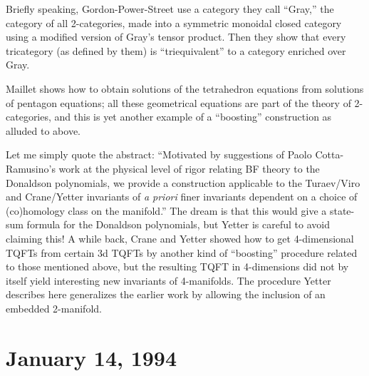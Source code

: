 \documentclass{article}
\def\tightlist{}
\renewcommand{\texttt}[1]{%
  \begingroup
  \ttfamily
  \begingroup\lccode`~=`/\lowercase{\endgroup\def~}{/\discretionary{}{}{}}%
  \begingroup\lccode`~=`[\lowercase{\endgroup\def~}{[\discretionary{}{}{}}%
  \begingroup\lccode`~=`.\lowercase{\endgroup\def~}{.\discretionary{}{}{}}%
  \catcode`/=\active\catcode`[=\active\catcode`.=\active
  \scantokens{#1\noexpand}%
  \endgroup
}
\begin{document}
Briefly speaking, Gordon-Power-Street use a category they call ``Gray,''
the category of all 2-categories, made into a symmetric monoidal closed
category using a modified version of Gray's tensor product. Then they
show that every tricategory (as defined by them) is ``triequivalent'' to
a category enriched over Gray.


Maillet shows how to obtain solutions of the tetrahedron equations from
solutions of pentagon equations; all these geometrical equations are
part of the theory of 2-categories, and this is yet another example of a
``boosting'' construction as alluded to above.


Let me simply quote the abstract: ``Motivated by suggestions of Paolo
Cotta-Ramusino's work at the physical level of rigor relating BF theory
to the Donaldson polynomials, we provide a construction applicable to
the Turaev/Viro and Crane/Yetter invariants of \emph{a priori} finer
invariants dependent on a choice of (co)homology class on the
manifold.'' The dream is that this would give a state-sum formula for
the Donaldson polynomials, but Yetter is careful to avoid claiming this!
A while back, Crane and Yetter showed how to get 4-dimensional TQFTs
from certain 3d TQFTs by another kind of ``boosting'' procedure related
to those mentioned above, but the resulting TQFT in 4-dimensions did not
by itself yield interesting new invariants of 4-manifolds. The procedure
Yetter describes here generalizes the earlier work by allowing the
inclusion of an embedded 2-manifold.
\hypertarget{week30}{%
\section{January 14, 1994}\label{week30}}
\end{document}
